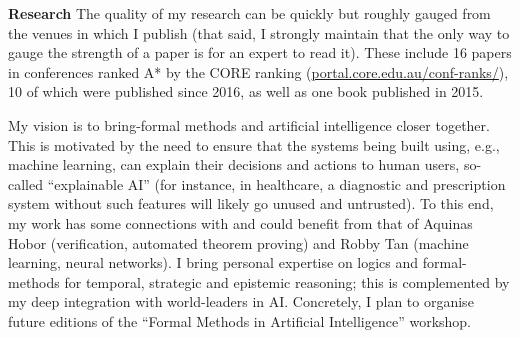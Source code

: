 \documentclass[10,a4paper,sans]{moderncv}
\begin{document}





% 

\textbf{Research}
The quality of my research can be quickly but roughly gauged from the venues in which I publish (that said, I strongly maintain that the only way to gauge the strength of a paper is for an expert to read it). These include 16 papers in conferences ranked A* by the CORE ranking (\url{portal.core.edu.au/conf-ranks/}), 10 of which were published since 2016, as well as one book published in 2015.

My vision is to bring-formal methods and artificial intelligence closer together. This is motivated by the need to ensure that the systems being built using, e.g.,  machine learning, can explain their decisions and actions to human users, so-called ``explainable AI'' (for instance, in healthcare, a diagnostic and prescription system without such features will likely go unused and untrusted). To this end, my work has some connections with and could benefit from that of Aquinas Hobor (verification, automated theorem proving) and Robby Tan (machine learning, neural networks). I bring personal expertise on logics and formal-methods for temporal, strategic and epistemic reasoning; this is complemented by my deep integration with world-leaders in AI. Concretely, I plan to organise future editions of the ``Formal Methods in Artificial Intelligence'' workshop.
\end{document}
